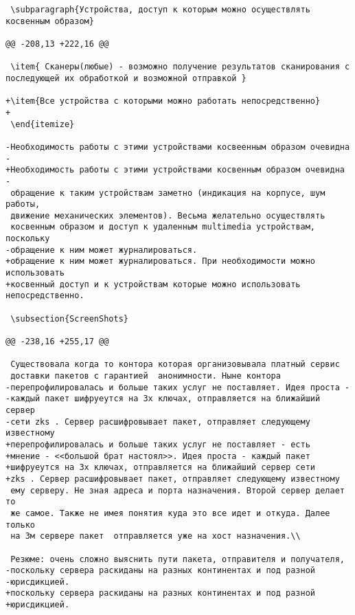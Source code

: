 \begin{verbatim}
 \subparagraph{Устройства, доступ к которым можно осуществлять косвенным образом}

@@ -208,13 +222,16 @@

 \item{ Сканеры(любые) - возможно получение результатов сканирования с последующей их обработкой и возможной отправкой }

+\item{Все устройства с которыми можно работать непосредственно}
+
 \end{itemize}

-Необходимость работы с этими устройствами косвеенным образом очевидна -
+Необходимость работы с этими устройствами косвенным образом очевидна -
 обращение к таким устройствам заметно (индикация на корпусе, шум работы,
 движение механических элементов). Весьма желательно осуществлять
 косвенным образом и доступ к удаленным multimedia устройствам, поскольку
-обращение к ним может журналироваться.
+обращение к ним может журналироваться. При необходимости можно использовать
+косвенный доступ и к устройствам которые можно использовать непосредственно.

 \subsection{ScreenShots}

@@ -238,16 +255,17 @@

 Существовала когда то контора которая организовывала платный сервис
 доставки пакетов с гарантией  анонимности. Ныне контора
-перепрофилировалась и больше таких услуг не поставляет. Идея проста -
-каждый пакет шифруеутся на 3х ключах, отправляется на ближайший сервер
-сети zks . Сервер расшифровывает пакет, отправляет следующему известному
+перепрофилировалась и больше таких услуг не поставляет - есть
+мнение - <<большой брат настоял>>. Идея проста - каждый пакет
+шифруеутся на 3х ключах, отправляется на ближайший сервер сети
+zks . Сервер расшифровывает пакет, отправляет следующему известному
 ему серверу. Не зная адреса и порта назначения. Второй сервер делает то
 же самое. Также не имея понятия куда это все идет и откуда. Далее только
 на 3м сервере пакет  отправляется уже на хост назначения.\\

 Резюме: очень сложно выяснить пути пакета, отправителя и получателя,
-поскольку сервера раскиданы на разных континентах и под разной
-юрисдикцией.
+поскольку сервера раскиданы на разных континентах и под разной
+юрисдикцией.



\end{verbatim}
